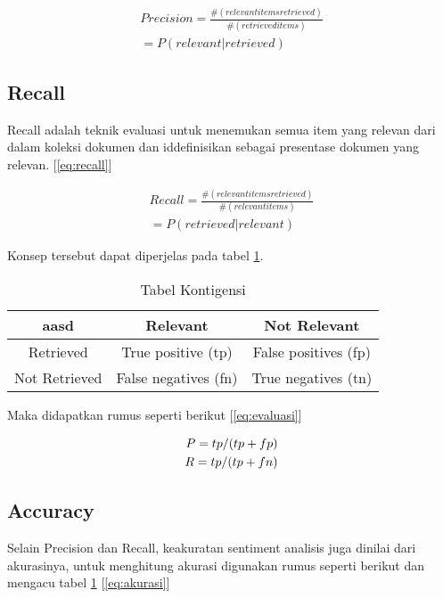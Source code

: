 \begin{equation}
\begin{split}
Precision = \frac{\#(relevant items retrieved)}{\#(retrieved items)} \\ 
= P(relevant|retrieved)
\label{eq:precision}
\end{split}
\end{equation}

\subsection*{Recall}
Recall adalah teknik evaluasi untuk menemukan semua item yang relevan dari dalam koleksi dokumen dan iddefinisikan sebagai presentase dokumen yang relevan. [\ref{eq:recall}]

\begin{equation}
\begin{split}
Recall = \frac{\#(relevant items retrieved)}{\#(relevant items)} \\ 
= P(retrieved|relevant)
\label{eq:recall}
\end{split}
\end{equation}

Konsep tersebut dapat diperjelas pada tabel \ref{tab:konsep}.

\begin{table}[hbt]
	\caption{Tabel Kontigensi}
	\centering
	\begin{adjustbox}{max width=\textwidth}
		\begin{tabular}{*{3}{c}}%
			\toprule
			aasd & Relevant & Not Relevant \\
			\midrule
			Retrieved & True positive (tp) & False positives (fp) \\
			Not Retrieved & False negatives (fn) & True negatives (tn) \\
			\bottomrule
		\end{tabular}
	\end{adjustbox}
	\label{tab:konsep}
\end{table}

Maka didapatkan rumus seperti berikut [\ref{eq:evaluasi}]

\begin{equation}
\begin{split}
\tiny
P = tp/(tp+fp) \\ 
R = tp/(tp+fn)
\label{eq:evaluasi}
\normalsize
\end{split}
\end{equation}

\subsection*{Accuracy}
Selain Precision dan Recall, keakuratan sentiment analisis juga dinilai dari akurasinya, untuk menghitung akurasi digunakan rumus seperti berikut dan mengacu tabel \ref{tab:konsep} [\ref{eq:akurasi}]

